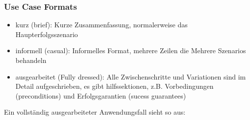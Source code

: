 \documentclass[
    ngerman,
    color=3b,
    summary,
    boxarc,
    main,
]{rubos-tuda-template}
\begin{document}
\subsubsection{Use Case Formats}
\begin{itemize}
    \item kurz (brief): Kurze Zusammenfassung, normalerweise das Haupterfolgsszenario
    \item informell (casual): Informelles Format, mehrere Zeilen die Mehrere Szenarios behandeln
    \item ausgearbeitet (Fully dressed): Alle Zwischenschritte und Variationen sind im Detail aufgeschrieben, es gibt hilfssektionen, z.B. Vorbedingungen (preconditions) und Erfolgsgarantien (sucess guarantees)
\end{itemize}
Ein vollständig ausgearbeiteter Anwendungsfall sieht so aus:
\end{document}

